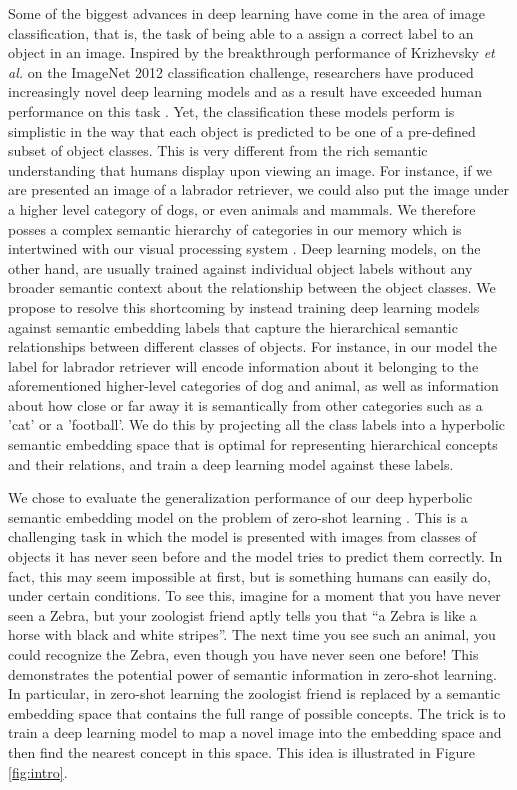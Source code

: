 \documentclass[12pt]{report}
\begin{document}
Some of the biggest advances in deep learning have come in the area of image classification, that is, the task of being able to a assign a correct label to an object in an image. Inspired by the breakthrough performance of Krizhevsky \textit{et al.} \cite{Krizhevsky2012} on the ImageNet 2012 classification challenge, researchers have produced increasingly novel deep learning models and as a result have exceeded human performance on this task \cite{Dodge2017}. Yet, the classification these models perform is simplistic in the way that each object is predicted to be one of a pre-defined subset of object classes. This is very different from the rich semantic understanding that humans display upon viewing an image. For instance, if we are presented an image of a labrador retriever, we could also put the image under a higher level category of dogs, or even animals and mammals. We therefore posses a complex semantic hierarchy of categories in our memory which is intertwined with our visual processing system \cite{Joliceur1984}. Deep learning models, on the other hand, are usually trained against individual object labels without any broader semantic context about the relationship between the object classes. We propose to resolve this shortcoming by instead training deep learning models against semantic embedding labels that capture the hierarchical semantic relationships between different classes of objects. For instance, in our model the label for labrador retriever will encode information about it belonging to the aforementioned higher-level categories of dog and animal, as well as information about how close or far away it is semantically from other categories such as a 'cat' or a 'football'. We do this by projecting all the class labels into a hyperbolic semantic embedding space that is optimal for representing hierarchical concepts and their relations, and train a deep learning model against these labels.

We chose to evaluate the generalization performance of our deep hyperbolic semantic embedding model on the problem of zero-shot learning \cite{Palatucci2009}. This is a challenging task in which the model is presented with images from classes of objects it has never seen before and the model tries to predict them correctly. In fact, this may seem impossible at first, but is something humans can easily do, under certain conditions. To see this, imagine for a moment that you have never seen a Zebra, but your zoologist friend aptly tells you that ``a Zebra is like a horse with black and white stripes''. The next time you see such an animal, you could recognize the Zebra, even though you have never seen one before! This demonstrates the potential power of semantic information in zero-shot learning. In particular, in zero-shot learning the zoologist friend is replaced by a semantic embedding space that contains the full range of possible concepts. The trick is to train a deep learning model to map a novel image into the embedding space and then find the nearest concept in this space. This idea is illustrated in Figure \ref{fig:intro}.
\end{document}
